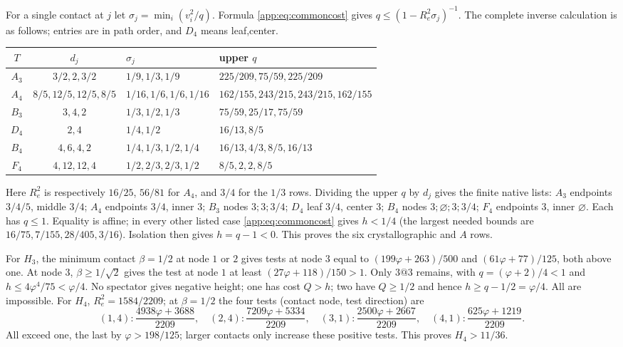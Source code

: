 \documentclass[11pt]{article}
\theoremstyle{definition}
\theoremstyle{remark}
\newcommand{\ph}{\varphi}
\begin{document}
For a single contact at $j$ let
$\sigma_j=\min_i(v_i^2/q)$. Formula \eqref{app:eq:commoncost} gives
$q\le(1-R_e^2\sigma_j)^{-1}$. The complete inverse calculation
is as follows; entries are in path order, and $D_4$ means leaf,center.
\begin{center}\small
\begin{tabular}{ccll}
\toprule
$T$&$d_j$&$\sigma_j$&upper $q$\\ \midrule
$A_3$&$3/2,2,3/2$&$1/9,1/3,1/9$&$225/209,75/59,225/209$\\
$A_4$&$8/5,12/5,12/5,8/5$&$1/16,1/6,1/6,1/16$&$162/155,243/215,243/215,162/155$\\
$B_3$&$3,4,2$&$1/3,1/2,1/3$&$75/59,25/17,75/59$\\
$D_4$&$2,4$&$1/4,1/2$&$16/13,8/5$\\
$B_4$&$4,6,4,2$&$1/4,1/3,1/2,1/4$&$16/13,4/3,8/5,16/13$\\
$F_4$&$4,12,12,4$&$1/2,2/3,2/3,1/2$&$8/5,2,2,8/5$\\ \bottomrule
\end{tabular}\end{center}
Here $R_e^2$ is respectively $16/25$, $56/81$ for $A_4$, and
$3/4$ for the $1/3$ rows. Dividing the upper $q$ by $d_j$
gives the finite native lists:
$A_3$ endpoints $3/4/5$, middle $3/4$;
$A_4$ endpoints $3/4$, inner $3$;
$B_3$ nodes $3;3;3/4$;
$D_4$ leaf $3/4$, center $3$;
$B_4$ nodes $3;\varnothing;3;3/4$;
$F_4$ endpoints $3$, inner $\varnothing$.
Each has $q\le1$. Equality is affine; in every other listed case
\eqref{app:eq:commoncost} gives $h<1/4$ (the largest needed bounds are
$16/75,7/155,28/405,3/16$). Isolation then gives $h=q-1<0$.
This proves the six crystallographic and $A$ rows.

For $H_3$, the minimum contact $\beta=1/2$ at node $1$ or $2$
gives tests at node $3$ equal to
$(199\ph+263)/500$ and $(61\ph+77)/125$, both above one.
At node $3$, $\beta\ge1/\sqrt2$ gives the test at node $1$
at least $(27\ph+118)/150>1$. Only $3@3$ remains, with
$q=(\ph+2)/4<1$ and $h\le4\ph^4/75<\ph/4$.
No spectator gives negative height; one has cost $Q>h$; two have
$Q\ge1/2$ and hence $h\ge q-1/2=\ph/4$. All are impossible.
For $H_4$, $R_e^2=1584/2209$; at $\beta=1/2$ the four tests
(contact node, test direction) are
\[
(1,4):\frac{4938\ph+3688}{2209},\quad
(2,4):\frac{7209\ph+5334}{2209},\quad
(3,1):\frac{2500\ph+2667}{2209},\quad
(4,1):\frac{625\ph+1219}{2209}.
\]
All exceed one, the last by $\ph>198/125$; larger contacts only
increase these positive tests. This proves $H_4>11/36$.
\end{document}

